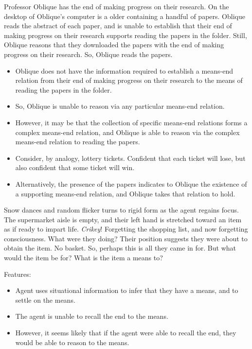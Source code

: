 \documentclass[10pt]{article}
\begin{document}
\begin{scenario}
  Professor Oblique has the end of making progress on their research.
  On the desktop of Oblique's computer is a older containing a handful of papers.
  Oblique reads the abstract of each paper, and is unable to establish that their end of making progress on their research supports reading the papers in the folder.
  Still, Oblique reasons that they downloaded the papers with the end of making progress on their research.
  So, Oblique reads the papers.
\end{scenario}

\begin{itemize}
\item Oblique does not have the information required to establish a means-end relation from their end of making progress on their research to the means of reading the papers in the folder.
\item So, Oblique is unable to reason via any particular means-end relation.
\item However, it may be that the collection of specific means-end relations forms a complex means-end relation, and Oblique is able to reason via the complex means-end relation to reading the papers.
\item Consider, by analogy, lottery tickets.
  Confident that each ticket will lose, but also confident that some ticket will win.
\item Alternatively, the presence of the papers indicates to Oblique the existence of a supporting means-end relation, and Oblique takes that relation to hold.
\end{itemize}


\begin{scenario}
  Snow dances and random flicker turns to rigid form as the agent regains focus.
  The supermarket aisle is empty, and their left hand is stretched toward an item as if ready to impart life.
  \emph{Crikey}!
  Forgetting the shopping list, and now forgetting consciousness.
  What were they doing?
  Their position suggests they were about to obtain the item.
  No basket. So, perhaps this is all they came in for.
  But what would the item be for? What is the item a means to?
\end{scenario}

Features:
\begin{itemize}
\item Agent uses situational information to infer that they have a means, and to settle on the means.
\item The agent is unable to recall the end to the means.
\item However, it seems likely that if the agent were able to recall the end, they would be able to reason to the means.
\end{itemize}
\end{document}
